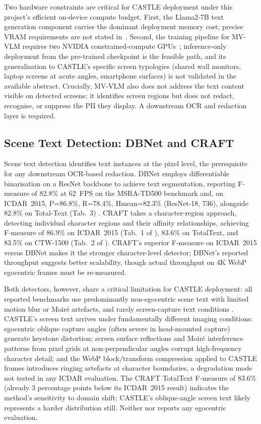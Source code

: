 \documentclass[12pt, onecolumn]{IEEEtran}
\begin{document}
Two hardware constraints are critical for CASTLE deployment under this
project's efficient on-device compute budget. First, the Llama2-7B text generation component carries the dominant deployment memory cost; precise VRAM requirements are not stated in~\cite{li2026screen}. Second, the training pipeline for MV-VLM requires
two NVIDIA constrained-compute GPUs~\cite{li2026screen}; inference-only deployment from the pre-trained checkpoint is the feasible path, and
its generalisation to CASTLE's specific screen typologies (shared wall
monitors, laptop screens at acute angles, smartphone surfaces) is not
validated in the available abstract. Crucially, MV-VLM also does not
address the text content visible on detected screens: it identifies
screen regions but does not redact, recognise, or suppress the PII they
display. A downstream OCR and redaction layer is required.

\subsection{Scene Text Detection: DBNet and CRAFT}

Scene text detection identifies text instances at the pixel level, the
prerequisite for any downstream OCR-based redaction. DBNet
\cite{liao2020dbnet} employs differentiable binarisation on a ResNet
backbone to achieve text segmentation, reporting F-measure of 82.8\% at
62~FPS on the MSRA-TD500 benchmark and, on ICDAR~2015, P=86.8\%,
R=78.4\%, Hmean=82.3\% (ResNet-18, 736), alongside 82.8\% on Total-Text (Tab.~3)
\cite{liao2020dbnet}. CRAFT \cite{baek2019craft} takes a
character-region approach, detecting individual character regions and
their affinity relationships, achieving F-measure of 86.9\% on
ICDAR~2015 (Tab.~1 of \cite{baek2019craft}), 83.6\% on TotalText, and 83.5\% on CTW-1500
(Tab.~2 of \cite{baek2019craft}). CRAFT's superior F-measure on ICDAR~2015 versus
DBNet makes it the stronger character-level detector; DBNet's reported
throughput suggests better scalability, though actual throughput on 4K
WebP egocentric frames must be re-measured.

Both detectors, however, share a critical limitation for CASTLE
deployment: all reported benchmarks use predominantly non-egocentric
scene text with limited motion blur or Moir{\'e} artefacts, and rarely
screen-capture text conditions \cite{liao2020dbnet, baek2019craft}.
CASTLE's screen text arrives under fundamentally different imaging
conditions: egocentric oblique capture angles (often severe in
head-mounted capture) generate keystone distortion; screen surface
reflections and Moir{\'e} interference patterns from pixel grids at
non-perpendicular angles corrupt high-frequency character detail; and
the WebP block/transform compression applied to CASTLE frames
introduces ringing artefacts at character boundaries, a degradation
mode not tested in any ICDAR evaluation. The CRAFT TotalText F-measure
of 83.6\% \cite{baek2019craft} (already 3 percentage points below its
ICDAR~2015 result) indicates the method's sensitivity to domain shift;
CASTLE's oblique-angle screen text likely represents a harder
distribution still. Neither \cite{liao2020dbnet} nor
\cite{baek2019craft} reports any egocentric evaluation.
\end{document}
